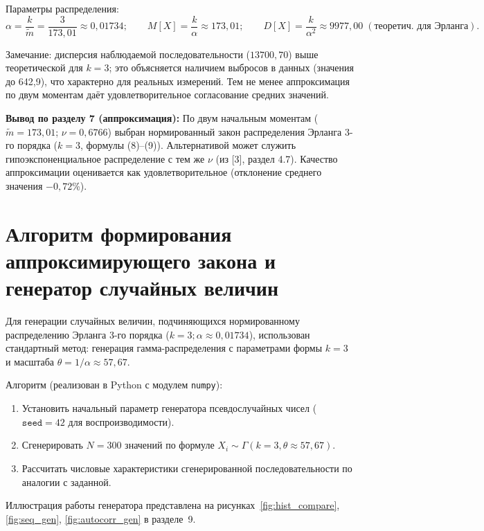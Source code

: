 \documentclass[a4paper,12pt]{article}
\begin{document}
Параметры распределения:
\begin{equation*}
\alpha = \frac{k}{\tilde{m}} = \frac{3}{173{,}01} \approx 0{,}01734; \qquad
M[X] = \frac{k}{\alpha} \approx 173{,}01; \qquad D[X] = \frac{k}{\alpha^2} \approx 9977{,}00 \; (\text{теоретич. для Эрланга}).
\end{equation*}

Замечание: дисперсия наблюдаемой последовательности ($13700{,}70$) выше теоретической для $k=3$; это объясняется наличием выбросов в данных (значения до 642,9), что характерно для реальных измерений. Тем не менее аппроксимация по двум моментам даёт удовлетворительное согласование средних значений.

\textbf{Вывод по разделу 7 (аппроксимация):} По двум начальным моментам ($\tilde{m}=173{,}01$; $\nu=0{,}6766$) выбран нормированный закон распределения Эрланга 3-го порядка ($k=3$, формулы (8)–(9)). Альтернативой может служить гипоэкспоненциальное распределение с тем же $\nu$ (из [3], раздел 4.7). Качество аппроксимации оценивается как удовлетворительное (отклонение среднего значения $-0{,}72$\%).

\section{Алгоритм формирования аппроксимирующего закона и генератор случайных величин}

Для генерации случайных величин, подчиняющихся нормированному распределению Эрланга 3-го порядка ($k=3; \alpha \approx 0{,}01734$), использован стандартный метод: генерация гамма-распределения с параметрами формы $k=3$ и масштаба $\theta = 1/\alpha \approx 57{,}67$.

Алгоритм (реализован в Python с модулем \texttt{numpy}):
\begin{enumerate}
    \item Установить начальный параметр генератора псевдослучайных чисел ($\texttt{seed}=42$ для воспроизводимости).
    \item Сгенерировать $N=300$ значений по формуле $X_i \sim \Gamma(k=3, \theta \approx 57{,}67)$.
    \item Рассчитать числовые характеристики сгенерированной последовательности по аналогии с заданной.
\end{enumerate}

Иллюстрация работы генератора представлена на рисунках~\ref{fig:hist_compare}, \ref{fig:seq_gen}, \ref{fig:autocorr_gen} в разделе~9.
\end{document}
